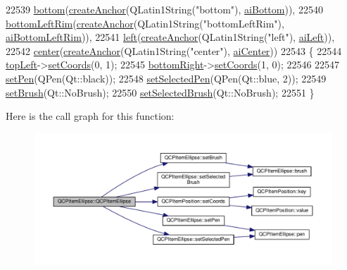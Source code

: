\begin{DoxyCode}
22539   \hyperlink{class_q_c_p_item_ellipse_a2dc80ff9f5db600eae0133bdde65066f}{bottom}(\hyperlink{class_q_c_p_abstract_item_af3fc92527802078ca395138748b629a7}{createAnchor}(QLatin1String(\textcolor{stringliteral}{"bottom"}), \hyperlink{class_q_c_p_item_ellipse_a415009889543169f35b70795f415e45ea5894287dedaeec1f48394fd950ccff5b}{aiBottom})),
22540   \hyperlink{class_q_c_p_item_ellipse_a31f31a9e9f9098c90fb47573094276c5}{bottomLeftRim}(\hyperlink{class_q_c_p_abstract_item_af3fc92527802078ca395138748b629a7}{createAnchor}(QLatin1String(\textcolor{stringliteral}{"bottomLeftRim"}), 
      \hyperlink{class_q_c_p_item_ellipse_a415009889543169f35b70795f415e45ea7b8101bfc590af8ce32961f6545c4f90}{aiBottomLeftRim})),
22541   \hyperlink{class_q_c_p_item_ellipse_aa259cd03efaedf60cf5b1019b20e4f2b}{left}(\hyperlink{class_q_c_p_abstract_item_af3fc92527802078ca395138748b629a7}{createAnchor}(QLatin1String(\textcolor{stringliteral}{"left"}), \hyperlink{class_q_c_p_item_ellipse_a415009889543169f35b70795f415e45eae74dad00419a0e1f42877510158fb922}{aiLeft})),
22542   \hyperlink{class_q_c_p_item_ellipse_a8b6dd0e854f99239c5806ffdf2f590b3}{center}(\hyperlink{class_q_c_p_abstract_item_af3fc92527802078ca395138748b629a7}{createAnchor}(QLatin1String(\textcolor{stringliteral}{"center"}), \hyperlink{class_q_c_p_item_ellipse_a415009889543169f35b70795f415e45ea580ec0e9b9fd1488fccf5783e52c0c02}{aiCenter}))
22543 \{
22544   \hyperlink{class_q_c_p_item_ellipse_a12fd8420c06718d0c8a2303d6a652848}{topLeft}->\hyperlink{class_q_c_p_item_position_aa988ba4e87ab684c9021017dcaba945f}{setCoords}(0, 1);
22545   \hyperlink{class_q_c_p_item_ellipse_ab73c8deafc0d8d1ef7d75b6cdcc37159}{bottomRight}->\hyperlink{class_q_c_p_item_position_aa988ba4e87ab684c9021017dcaba945f}{setCoords}(1, 0);
22546   
22547   \hyperlink{class_q_c_p_item_ellipse_adb81a663ed2420fcfa011e49f678d1a6}{setPen}(QPen(Qt::black));
22548   \hyperlink{class_q_c_p_item_ellipse_a6c542fba1dc918041c583f58a50dde99}{setSelectedPen}(QPen(Qt::blue, 2));
22549   \hyperlink{class_q_c_p_item_ellipse_a49fc74e6965834e873d027d026def798}{setBrush}(Qt::NoBrush);
22550   \hyperlink{class_q_c_p_item_ellipse_a9693501cfaa43a099655c75bed0dab3f}{setSelectedBrush}(Qt::NoBrush);
22551 \}
\end{DoxyCode}


Here is the call graph for this function\+:\nopagebreak
\begin{figure}[H]
\begin{center}
\leavevmode
\includegraphics[width=350pt]{class_q_c_p_item_ellipse_a759b77ef002515eba0263b5447ecb3fb_cgraph}
\end{center}
\end{figure}


